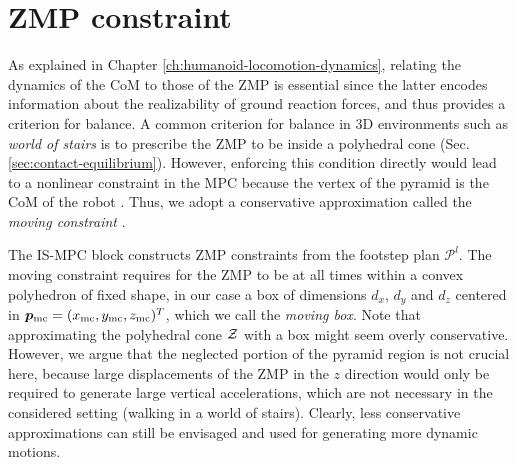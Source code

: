 \section{ZMP constraint}
As explained in Chapter \ref{ch:humanoid-locomotion-dynamics},
relating the dynamics of the CoM to those of the ZMP is essential since the
latter encodes information about the realizability of ground reaction forces,
and thus provides a criterion for balance. A common criterion for balance
in 3D environments such as \textit{world of stairs}
is to prescribe the ZMP to be inside a polyhedral cone
(Sec. \ref{sec:contact-equilibrium}). However, enforcing this condition
directly would lead to a nonlinear constraint
in the MPC because the vertex of the pyramid is the CoM of the robot
\cite{Caron2017DynamicWalkingOverRoughTerrains}.
Thus, we adopt a conservative approximation called the \textit{moving constraint}
\cite{Aboudonia2017Humanoids}.

The IS-MPC block constructs ZMP constraints from the footstep plan
$\mathcal{P}^l$. The moving constraint requires for the ZMP to be at all
times within a convex
polyhedron of fixed shape, in our case a box of dimensions $d_x$, $d_y$ and
$d_z$ centered in ${\bm{p}}_{\rm mc}=(x_{\rm mc}, y_{\rm mc}, z_{\rm mc})^T$,
which we call the \textit{moving box}. Note that approximating the polyhedral cone
$\cal Z$ with a box might seem overly conservative. However, we argue that the
neglected portion of the pyramid region is not crucial here, because large
displacements of the ZMP in the $z$ direction would only be required to generate
large vertical accelerations, which are not necessary in the considered setting
(walking in a world of stairs). Clearly, less conservative approximations can
still be envisaged and used for generating more dynamic motions.

